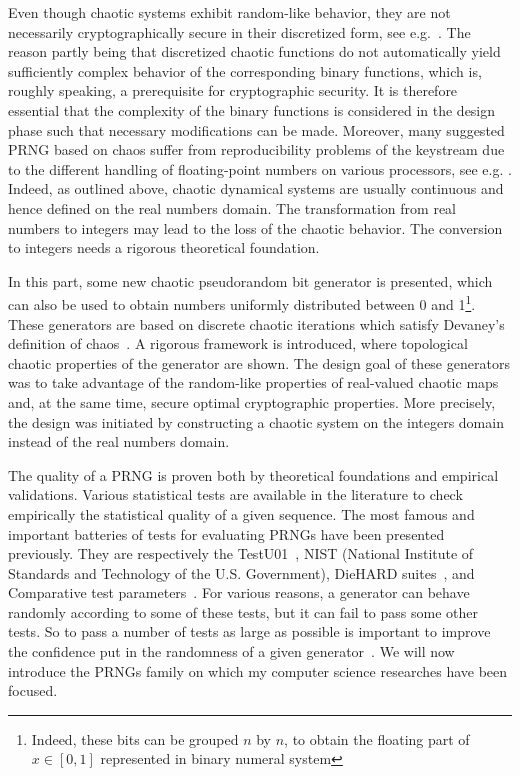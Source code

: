 Even though chaotic systems exhibit random-like behavior, they are not necessarily cryptographically secure in their discretized form, see e.g.~\cite{HabutsuNSM91,Biham91cryptanalysisof}. The reason partly being that discretized chaotic functions do not automatically yield sufficiently complex behavior of the corresponding binary functions, which is, roughly speaking, a prerequisite for cryptographic security. It is therefore essential that the complexity of the binary functions is considered in the design phase such that necessary modifications can be made. Moreover, many suggested PRNG based on chaos suffer from reproducibility problems of the keystream due to the different handling of floating-point numbers on various processors, see e.g. \cite{Matthews:1984}.
Indeed, as outlined above, chaotic dynamical systems are usually continuous and hence defined on the real numbers domain. The transformation from real numbers to integers may lead to the loss of the chaotic behavior. The conversion to integers needs a rigorous theoretical foundation.

In this part, some new chaotic pseudorandom bit generator is presented, which can also be used to obtain numbers uniformly distributed between 0 and 1\footnote{Indeed, these bits can be grouped $n$ by $n$, to obtain the floating part of $x \in [0,1]$ represented in binary numeral system}. These generators are based on discrete chaotic iterations which satisfy Devaney's definition of chaos~\cite{guyeux09}. A rigorous  framework is introduced, where topological chaotic properties of the generator are shown. 
The design goal of  these generators was to take advantage of the random-like properties of real-valued chaotic maps and, at the same time, secure optimal cryptographic properties. More precisely, the design was initiated by constructing a chaotic system on the integers domain instead of the real numbers domain.

The quality of a PRNG is proven both by theoretical foundations and empirical validations. Various statistical tests are available in the literature to check empirically the statistical quality of a given sequence. The most famous and important batteries of tests for evaluating PRNGs have been presented previously. They are respectively the TestU01~\cite{Lecuyer2009}, NIST (National Institute of Standards and Technology of the U.S. Government), DieHARD suites~\cite{ANDREW2008,Marsaglia1996}, and Comparative test parameters~\cite{Menezes1997}. For various reasons, a generator can behave randomly according to some of these tests, but it can fail to pass some other tests. So to pass a number of tests as large as possible is important to improve the confidence put in the randomness of a given generator~\cite{Turan2008}. We will now introduce the PRNGs family on which my computer science researches have been focused.

